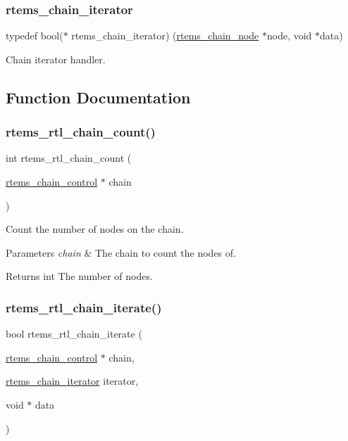 \subsubsection{\texorpdfstring{rtems\_chain\_iterator}{rtems\_chain\_iterator}}
{\footnotesize\ttfamily typedef bool($\ast$ rtems\+\_\+chain\+\_\+iterator) (\mbox{\hyperlink{structChain__Node__struct}{rtems\+\_\+chain\+\_\+node}} $\ast$node, void $\ast$data)}

Chain iterator handler. 

\subsection{Function Documentation}
\mbox{\label{rtl-chain-iterator_8h_abba44d4b003ea714cc986e27e454f76e}} 
\subsubsection{\texorpdfstring{rtems\_rtl\_chain\_count()}{rtems\_rtl\_chain\_count()}}
{\footnotesize\ttfamily int rtems\+\_\+rtl\+\_\+chain\+\_\+count (\begin{DoxyParamCaption}\item[{\mbox{\hyperlink{unionChain__Control}{rtems\+\_\+chain\+\_\+control}} $\ast$}]{chain }\end{DoxyParamCaption})}

Count the number of nodes on the chain.


\begin{DoxyParams}{Parameters}
{\em chain} & The chain to count the nodes of. \\
\hline
\end{DoxyParams}
\begin{DoxyReturn}{Returns}
int The number of nodes. 
\end{DoxyReturn}
\mbox{\label{rtl-chain-iterator_8h_aa16454dff4035ca37c6a6f68c4b4ce6b}} 
\subsubsection{\texorpdfstring{rtems\_rtl\_chain\_iterate()}{rtems\_rtl\_chain\_iterate()}}
{\footnotesize\ttfamily bool rtems\+\_\+rtl\+\_\+chain\+\_\+iterate (\begin{DoxyParamCaption}\item[{\mbox{\hyperlink{unionChain__Control}{rtems\+\_\+chain\+\_\+control}} $\ast$}]{chain,  }\item[{\mbox{\hyperlink{rtl-chain-iterator_8h_a4a6076e3f99c2cd93d4cec1b50199f45}{rtems\+\_\+chain\+\_\+iterator}}}]{iterator,  }\item[{void $\ast$}]{data }\end{DoxyParamCaption})}

